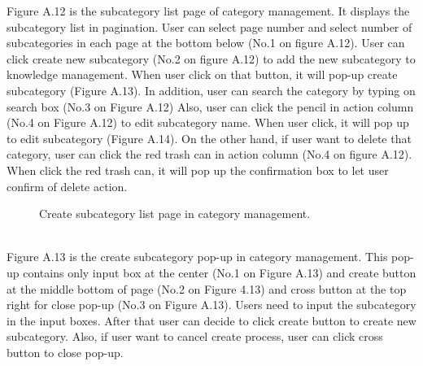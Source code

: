 \documentclass[12pt,oneside,openright,a4paper]{cpe-english-project}
\begin{document}
Figure A.12 is the subcategory list page of category management. It displays the 
subcategory list in pagination. User can select page number and select number of 
subcategories in each page at the bottom below (No.1 on figure A.12).
User can click create new subcategory (No.2 on figure A.12) to add the new 
subcategory to knowledge management. When user click on that button, it will pop-up create 
subcategory (Figure A.13). In addition, user can search the category by typing on search box 
(No.3 on Figure A.12)
Also, user can click the pencil in action column (No.4 on Figure A.12) to edit 
subcategory name. When user click, it will pop up to edit subcategory (Figure A.14). On the 
other hand, if user want to delete that category, user can click the red trash can in action 
column (No.4 on figure A.12). When click the red trash can, it will pop up the confirmation 
box to let user confirm of delete action. \\
\begin{figure}[!h]\centering
{}
\caption{Create subcategory list page in category management.
}\label{fig:Create subcategory list page in category management.
}
\end{figure} \\
Figure A.13 is the create subcategory pop-up in category management. This pop-up 
contains only input box at the center (No.1 on Figure A.13) and create button at the middle 
bottom of page (No.2 on Figure 4.13) and cross button at the top right for close pop-up (No.3 
on Figure A.13).
Users need to input the subcategory in the input boxes. After that user can decide to 
click create button to create new subcategory. Also, if user want to cancel create process, 
user can click cross button to close pop-up. \\
\end{document}
